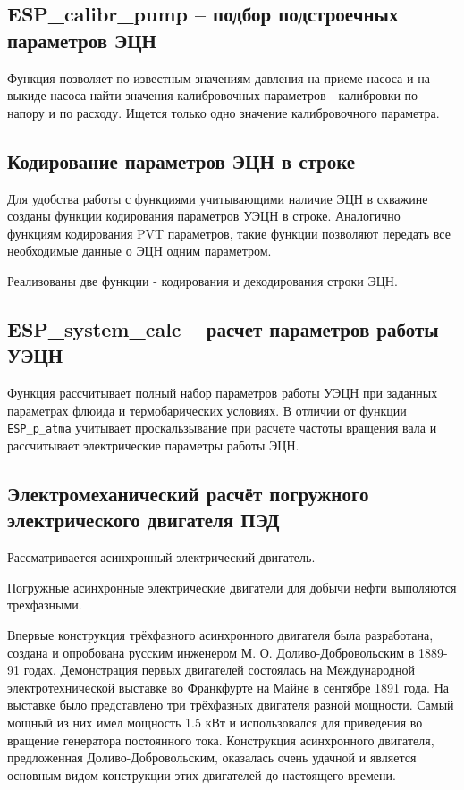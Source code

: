 
\subsection{ESP\_calibr\_pump – подбор подстроечных параметров ЭЦН}

Функция позволяет по известным значениям давления на приеме насоса и на выкиде насоса найти значения калибровочных параметров - калибровки по напору и по расходу. Ищется только одно значение калибровочного параметра.



\subsection{Кодирование параметров ЭЦН в строке}
Для удобства работы с функциями учитывающими наличие ЭЦН в скважине созданы функции кодирования параметров УЭЦН в строке. Аналогично функциям кодирования PVT параметров, такие функции позволяют передать все необходимые данные о ЭЦН одним параметром.

Реализованы две функции - кодирования и декодирования строки ЭЦН.



\subsection{ESP\_system\_calc – расчет параметров работы УЭЦН}
Функция рассчитывает полный набор параметров работы УЭЦН при заданных параметрах флюида и термобарических условиях. В отличии от функции  \texttt{ESP_p_atma} учитывает проскальзывание при расчете частоты вращения вала и рассчитывает электрические параметры работы ЭЦН.


\iffalse
\subsection{Электромеханический расчёт погружного электрического двигателя ПЭД}
Рассматривается асинхронный электрический двигатель. 

Погружные асинхронные электрические двигатели для добычи нефти выполяются трехфазными. 

Впервые конструкция трёхфазного асинхронного двигателя была разработана, создана и опробована русским инженером М. О. Доливо-Добровольским в 1889-91 годах. Демонстрация первых двигателей состоялась на Международной электротехнической выставке во Франкфурте на Майне в сентябре 1891 года. На выставке было представлено три трёхфазных двигателя разной мощности. Самый мощный из них имел мощность 1.5 кВт и использовался для приведения во вращение генератора постоянного тока. Конструкция асинхронного двигателя, предложенная Доливо-Добровольским, оказалась очень удачной и является основным видом конструкции этих двигателей до настоящего времени.

